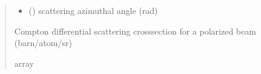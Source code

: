 \documentclass[letterpaper,10pt,english,openany,oneside]{sphinxmanual}
\begin{document}
\begin{fulllineitems}
\begin{quote}
\begin{description}
\begin{itemize}
\item {} 
\sphinxAtStartPar
{} () \textendash{} scattering azimuthal angle (rad)

\end{itemize}

\sphinxAtStartPar
Compton differential scattering cross\sphinxhyphen{}section for a polarized beam
(barn/atom/sr)

\sphinxAtStartPar
array

\end{description}\end{quote}

\end{fulllineitems}


\begin{DUlineblock}{0em}
\item[] 
\end{DUlineblock}
\end{document}
